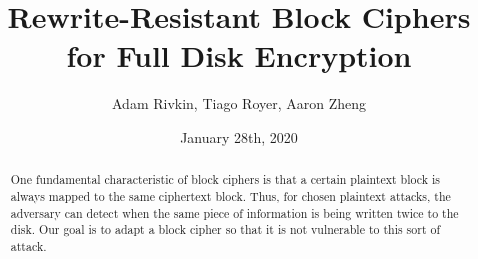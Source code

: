 \documentclass[11pt]{article}
\begin{document}
\title{
    Rewrite-Resistant Block Ciphers for Full Disk Encryption
}
\date{January 28th, 2020}
\author{Adam Rivkin, Tiago Royer, Aaron Zheng}
\maketitle

\begin{abstract}
    One fundamental characteristic of block ciphers
    is that a certain plaintext block is always mapped to the same ciphertext block.
    Thus,
    for chosen plaintext attacks,
    the adversary can detect when the same piece of information
    is being written twice to the disk.
    Our goal is to adapt a block cipher
    so that it is not vulnerable to this sort of attack.
\end{abstract}
\end{document}
